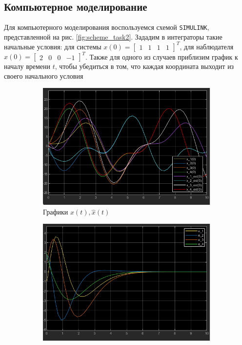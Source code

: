 \documentclass[a4paper, 12pt]{article}
\begin{document}
    \subsection{Компьютерное моделирование}
    Для компьютерного моделирования воспользуемся схемой \texttt{SIMULINK},
    представленной на рис. \ref{fig:scheme_task2}. Зададим в интеграторы
    такие начальные условия:
    для системы $x(0)=\begin{bmatrix}
        1 &1 &1 &1
    \end{bmatrix}^T$, для наблюдателя $\hat{x}(0)=\begin{bmatrix}
        2 &0 &0 &-1
    \end{bmatrix}^T$. Также для одного из случаев приблизим график к началу времени $t$,
    чтобы убедиться в том, что каждая координата выходит из своего начального условия
    \begin{figure}[H]
        \centering
        \begin{subfigure}{0.45\textwidth}
            \centering
            \includegraphics[width=\linewidth]{x_t_x_est_t_l1_task2.png}
            \caption{Графики $x(t),\hat{x}(t)$}
            \label{fig:task_2_x_t_l1}
        \end{subfigure}
        \hfill
        \begin{subfigure}{0.45\textwidth}
            \centering
            \includegraphics[width=\linewidth]{e_l1_task2.png}

\end{subfigure}
\end{figure}
\end{document}
